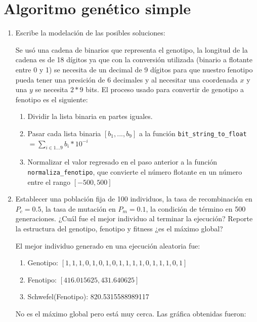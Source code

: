 \documentclass[11pt,letterpaper]{article}
\begin{document}
    \section{Algoritmo genético simple}
    \begin{enumerate}[label=\alph*)]
        \item Escribe la modelación de las posibles soluciones:

        Se usó una cadena de binarios que representa el genotipo, la longitud de la cadena es de 18 dígitos ya que con la conversión utilizada (binario a flotante entre 0 y 1) se necesita de un decimal de 9 dígitos para que nuestro fenotipo pueda tener una presición de 6 decimales y al necesitar una coordenada $x$ y una $y$ se necesita $2*9$ bits. El proceso usado para convertir de genotipo a fenotipo es el siguiente:
        \begin{enumerate}[label=\arabic*.]
            \item Dividir la lista binaria en partes iguales.
            \item Pasar cada lista binaria $[b_1, ..., b_9]$ a la función \texttt{bit\_string\_to\_float} $= \sum_{i \in 1...9} b_i * 10^{-i}$
            \item Normalizar el valor regresado en el paso anterior a la función \texttt{normaliza\_fenotipo}, que convierte el número flotante en un número entre el rango $[-500, 500]$
        \end{enumerate}

        \item Establecer una población fija de 100 individuos, la tasa de recombinación en $P_c =0.5$, la tasa de mutación en $P_m=0.1$, la condición de término en 500 generaciones. ¿Cuál fue el mejor individuo al terminar la ejecución? Reporte la estructura del genotipo, fenotipo y fitness ¿es el máximo global?

        El mejor individuo generado en una ejecución aleatoria fue:
        \begin{enumerate}
            \item Genotipo:  $[1, 1, 1, 0, 1, 0, 1, 0, 1, 1, 1, 1, 0, 1, 1, 1, 0, 1]$
            \item Fenotipo:  $[416.015625, 431.640625]$
            \item Schwefel(Fenotipo):  820.5315588989117
        \end{enumerate}

        No es el máximo global pero está muy cerca. Las gráfica obtenidas fueron:


\end{enumerate}
\end{document}
